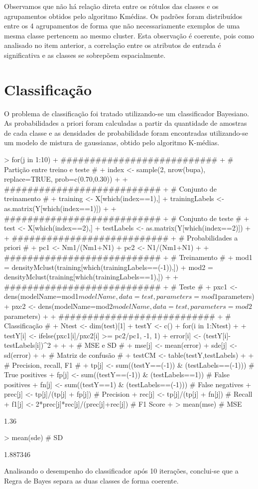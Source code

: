 \documentclass{article}
\begin{document}
Observamos que não há relação direta entre os rótulos das classes e os agrupamentos obtidos pelo algoritmo Kmédias. Os padrões foram distribuídos entre os 4 agrupamentos de forma que não necessariamente exemplos de uma mesma classe pertencem ao mesmo cluster. Esta observação é coerente, pois como analisado no item anterior, a correlação entre os atributos de entrada é significativa e as classes se sobrepõem espacialmente.

\section{Classificação}
O problema de classificação foi tratado utilizando-se um classificador Bayesiano. As probabilidades a priori foram calculadas a partir da quantidade de amostras de cada classe e as densidades de probabilidade foram encontradas utilizando-se um modelo de mistura de gaussianas, obtido pelo algoritmo K-médias.
\begin{Schunk}
\begin{Sinput}
> for(j in 1:10){
+   ###########################
+   # Partição entre treino e teste #
+   index <- sample(2, nrow(bupa), replace=TRUE, prob=c(0.70,0.30))
+   
+   ###########################
+   # Conjunto de treinamento #
+   training <- X[which(index==1),]
+   trainingLabels <- as.matrix(Y[which(index==1)])
+   
+   ###########################
+   # Conjunto de teste #
+   test <- X[which(index==2),]
+   testLabels <- as.matrix(Y[which(index==2)])
+   
+   ###########################
+   # Probabilidades a priori #
+   pc1 <- Nm1/(Nm1+N1)
+   pc2 <- N1/(Nm1+N1)
+   
+   ###########################
+   # Treinamento #
+   mod1 = densityMclust(training[which(trainingLabels==(-1)),])
+   mod2 = densityMclust(training[which(trainingLabels==1),])
+   
+   ###########################
+   # Teste #
+   pxc1 <- dens(modelName=mod1$modelName, data = test, parameters = mod1$parameters)
+   pxc2 <- dens(modelName=mod2$modelName, data = test, parameters = mod2$parameters)
+   
+   ###########################
+   # Classificação #
+   Ntest <- dim(test)[1]
+   testY <- c()
+   for(i in 1:Ntest)
+   {
+     testY[i] <- ifelse(pxc1[i]/pxc2[i] >= pc2/pc1, -1, 1)
+     error[i] <- (testY[i]-testLabels[i])^2
+   }
+   
+   # MSE e SD #
+   mse[j] <- mean(error)
+   sde[j] <- sd(error)
+   
+   # Matriz de confusão #
+   testCM <- table(testY,testLabels)
+   
+   # Precision, recall, F1 #
+   tp[j] <- sum((testY==(-1)) & (testLabels==(-1))) # True positives
+   fp[j] <- sum((testY==(-1)) & (testLabels==1)) # False positives
+   fn[j] <- sum((testY==1) & (testLabels==(-1))) # False negatives
+   prec[j] <- tp[j]/(tp[j] + fp[j]) # Precision
+   rec[j] <- tp[j]/(tp[j] + fn[j]) # Recall
+   f1[j] <- 2*prec[j]*rec[j]/(prec[j]+rec[j]) # F1 Score
+ }
> mean(mse) # MSE
\end{Sinput}
\begin{Soutput}
[1] 1.36
\end{Soutput}
\begin{Sinput}
> mean(sde) # SD
\end{Sinput}
\begin{Soutput}
[1] 1.887346
\end{Soutput}
\end{Schunk}
Analisando o desempenho do classificador após 10 iterações, conclui-se que a Regra de Bayes separa as duas classes de forma coerente.
\end{document}

